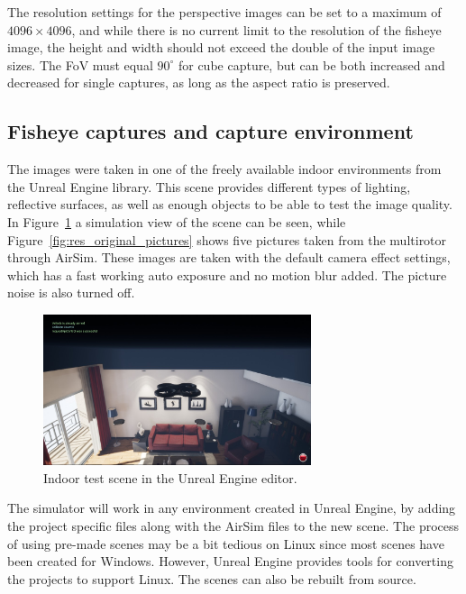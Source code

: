 The resolution settings for the perspective images can be set to a maximum of $4096\times4096$, and while there is no current limit to the resolution of the fisheye image, the height and width should not exceed the double of the input image sizes. The FoV must equal $90^\circ$ for cube capture, but can be both increased and decreased for single captures, as long as the aspect ratio is preserved. 

\subsection{Fisheye captures and capture environment}

The images were taken in one of the freely available indoor environments from the Unreal Engine library. This scene provides different types of lighting, reflective surfaces, as well as enough objects to be able to test the image quality. In Figure~\ref{fig:res_inflight} a simulation view of the scene can be seen, while Figure~\ref{fig:res_original_pictures} shows five pictures taken from the multirotor through AirSim. These images are taken with the default camera effect settings, which has a fast working auto exposure and no motion blur added. The picture noise is also turned off.

\begin{figure}[!htb]
    \centering
    \includegraphics[width = 0.7\textwidth]{rapport/fig/Results/inflight.jpg}
    \caption{Indoor test scene in the Unreal Engine editor.}
    \label{fig:res_inflight}
\end{figure}

The simulator will work in any environment created in Unreal Engine, by adding the project specific files along with the AirSim files to the new scene. The process of using pre-made scenes may be a bit tedious on Linux since most scenes have been created for Windows. However, Unreal Engine provides tools for converting the projects to support Linux. The scenes can also be rebuilt from source.

